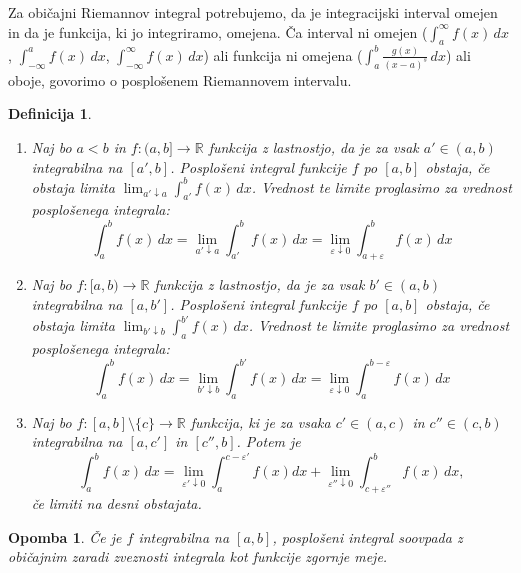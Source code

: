 \documentclass[10pt, a4paper]{article}
\newtheorem{defi}[izr]{Definicija}
\newenvironment{noticeB}{%
  \tcolorbox[%
  notitle,
  empty,
  enhanced,  %
  breakable,
  coltext=black,
  colback=white, 
  fontupper=\rmfamily,
  noparskip,
  sharp corners,
  boxrule=-1pt,  %
  frame hidden,
  left=7pt,  %
  right=7pt,
  top=5pt,
  bottom=5pt,
  before skip=2.5ex plus 2pt,
  after skip=2.5ex plus 2pt,
  borderline west = {1.5pt}{-0.1pt}{blue!30!black}, %
  overlay unbroken and last={%
    \draw[color=black, line width=1.25pt]
    ($(frame.south west)+(1.pt, -0.1pt)$) -- ++(2em, 0);
  }
  ]}
{\endtcolorbox}
\newenvironment{definicija}{\begin{noticeB}\begin{defi}}{%
\end{defi}\end{noticeB}}
\newtheorem*{opomba}{Opomba}
\newcommand{\R}{\mathbb {R}}
\newcommand{\rlimf}[3]{\lim_{#1 \downarrow #2} {#3}}
\begin{document}
Za običajni Riemannov integral potrebujemo, da je integracijski interval omejen in da je funkcija, ki jo integriramo, omejena.
Ča interval ni omejen ($\int_a ^{\infty} f(x)\,dx$, $\int_{-\infty} ^a f(x)\,dx$, $\int_{-\infty} ^{\infty} f(x)\,dx$)
ali funkcija ni omejena ($\int_a ^b \frac{g(x)}{(x-a)^s}\,dx$) ali oboje, govorimo o posplošenem Riemannovem intervalu.

\begin{definicija}
    \begin{enumerate}
        \item Naj bo $a < b$ in $f: (a, b] \rightarrow \R$ funkcija z lastnostjo, da je za vsak $a' \in (a, b)$ integrabilna na $[a', b]$.
        Posplošeni integral funkcije $f$ po $[a, b]$ obstaja, če obstaja limita $\rlimf{a'}{a}{\int_{a'} ^b f(x)\,dx}$.
        Vrednost te limite proglasimo za vrednost posplošenega integrala: $$\int_{a} ^b f(x)\,dx = \rlimf{a'}{a}{\int_{a'} ^b f(x)\,dx} = \rlimf{\varepsilon}{0}{\int_{a+\varepsilon} ^b f(x)\,dx}$$
        \item Naj bo $f: [a, b) \rightarrow \R$ funkcija z lastnostjo, da je za vsak $b' \in (a, b)$ integrabilna na $[a, b']$.
        Posplošeni integral funkcije $f$ po $[a, b]$ obstaja, če obstaja limita $\rlimf{b'}{b}{\int_{a} ^{b'} f(x)\,dx}$.
        Vrednost te limite proglasimo za vrednost posplošenega integrala: $$\int_{a} ^b f(x)\,dx = \rlimf{b'}{b}{\int_{a} ^{b'} f(x)\,dx} = \rlimf{\varepsilon}{0}{\int_{a} ^{b-\varepsilon} f(x)\,dx}$$
        \item Naj bo $f: [a, b] \setminus \{c\} \rightarrow \R$ funkcija, ki je za vsaka $c' \in (a, c)$ in $c''\in (c, b)$ integrabilna na $[a, c']$ in $[c'', b]$.
        Potem je $$\int_a ^b f(x)\,dx = \rlimf{\varepsilon'}{0}{\int_a ^{c-\varepsilon'} f(x)dx} + \rlimf{\varepsilon''}{0}{\int_{c+\varepsilon''} ^b f(x)}\,dx,$$
        če limiti na desni obstajata.
    \end{enumerate}
\end{definicija}

\begin{opomba}
    Če je $f$ integrabilna na $[a, b]$, posplošeni integral soovpada z običajnim zaradi zveznosti integrala kot funkcije zgornje meje.
\end{opomba}
\end{document}
